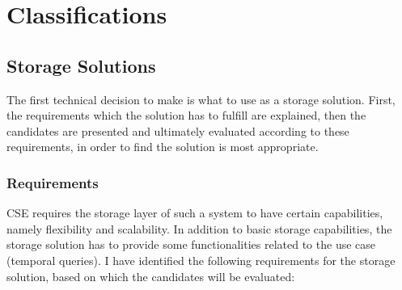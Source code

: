 %
\chapter{Classifications}
\label{ch:classifications}


\section{Storage Solutions}
\label{sec:classifications:storage}

The first technical decision to make is what to use as a storage solution.
First, the requirements which the solution has to fulfill are explained, then the candidates are presented and ultimately evaluated according to these requirements, in order to find the solution is most appropriate.

\subsection{Requirements}
\label{subsec:classifications:storage:req}

\ac{CSE} requires the storage layer of such a system to have certain capabilities, namely flexibility and scalability.
In addition to basic storage capabilities, the storage solution has to provide some functionalities related to the use case (temporal queries).
I have identified the following requirements for the storage solution, based on which the candidates will be evaluated:

